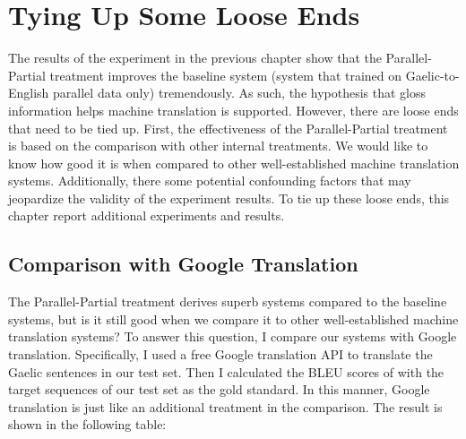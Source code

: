 \documentclass[final]{ua-thesis}
\numberwithin{equation}{section}
\begin{document}


\chapter{Tying Up Some Loose Ends}
\label{chap:Tying_Up}

The results of the experiment in the previous chapter show that the Parallel-Partial treatment improves the baseline system (system that trained on Gaelic-to-English parallel data only) tremendously. As such, the hypothesis that gloss information helps machine translation is supported. 
However, there are loose ends that need to be tied up. First, the effectiveness of the Parallel-Partial treatment is based on the comparison with other internal treatments. We would like to know how good it is when compared to other well-established machine translation systems.       
Additionally, there some potential confounding factors that may jeopardize the validity of the experiment results. 
To tie up these loose ends, this chapter report additional experiments and results.

\section{Comparison with Google Translation}
The Parallel-Partial treatment derives superb systems compared to the baseline systems, but is it still good when we compare it to other well-established machine translation systems? 
To answer this question, I compare our systems with Google translation.
Specifically, I used a free Google translation API \citep{google_api} to translate the Gaelic sentences in our test set. 
Then I calculated the BLEU scores of with the target sequences of our test set as the gold standard. In this manner, Google translation is just like an additional treatment in the comparison.  The result is shown in the following table:
\end{document}
